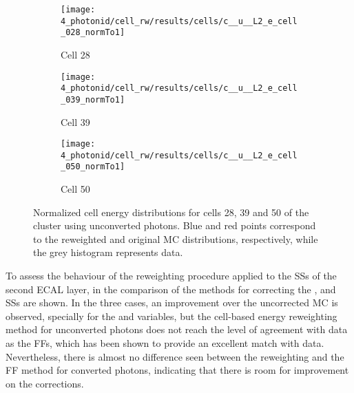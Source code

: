 \begin{figure}[ht!]
    \centering
    \begin{subfigure}[h]{0.32\linewidth}
        \centering
        \texttt{[image: 4\_photonid/cell\_rw/results/cells/c\_\_u\_\_L2\_e\_cell\_028\_normTo1]}
        \caption{Cell 28}
    \end{subfigure}
    \hfill
    \begin{subfigure}[h]{0.32\linewidth}
        \centering
        \texttt{[image: 4\_photonid/cell\_rw/results/cells/c\_\_u\_\_L2\_e\_cell\_039\_normTo1]}
        \caption{Cell 39}
    \end{subfigure}
    \hfill
    \begin{subfigure}[h]{0.32\linewidth}
        \centering
        \texttt{[image: 4\_photonid/cell\_rw/results/cells/c\_\_u\_\_L2\_e\_cell\_050\_normTo1]}
        \caption{Cell 50}
    \end{subfigure}
    \caption{Normalized cell energy distributions for cells 28, 39 and 50 of the cluster using unconverted photons. Blue and red points correspond to the reweighted and original \ac{MC} distributions, respectively, while the grey histogram represents data.}
    \label{fig:ss_corrections:cell_rw:results:cells}
\end{figure}



To assess the behaviour of the reweighting procedure applied to the \acp{SS} of the second \ac{ECAL} layer, in \Fig{\ref{fig:ss_corrections:cell_rw:results:ss}} the comparison of the methods for correcting the \reta, \rphi and \weta \acp{SS} are shown. In the three cases, an improvement over the uncorrected \ac{MC} is observed, specially for the \rphi and \weta variables, but the cell-based energy reweighting method for unconverted photons does not reach the level of agreement with data as the \acp{FF}, which has been shown to provide an excellent match with data. Nevertheless, there is almost no difference seen between the reweighting and the \ac{FF} method for converted photons, indicating that there is room for improvement on the corrections.



